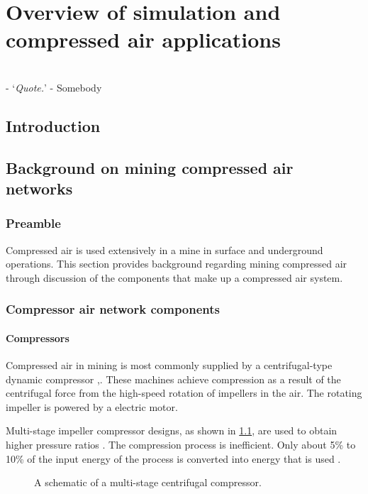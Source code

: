 \chapter{Overview of simulation and compressed air applications}
\label{Chap2}
\thispagestyle{empty}
\vspace{38em}
\hrulefill
\\-
\enquote*{\textit{Quote.}} - Somebody\\
\clearpage
\section{Introduction}
\section{Background on mining compressed air networks}
\subsection{Preamble}
Compressed air is used extensively in a mine in surface and underground operations. This section provides background regarding mining compressed air through discussion of the components that make up a compressed air system. 
\subsection{Compressor air network components}
\subsubsection{Compressors}

Compressed air in mining is most commonly supplied by a centrifugal-type dynamic compressor \cite{Fouche2016Masters},\cite{Booysen2012Masters}.  These machines achieve compression as a result of the centrifugal force from the high-speed rotation of impellers in the air. The rotating impeller is  powered by a electric motor.
\par 
 Multi-stage impeller compressor designs, as shown in \cref{fig: Compressor diagram}\footnotemark[1], are used to obtain higher pressure ratios \cite{Fouche2016Masters}. The compression process is inefficient. Only about 5\% to 10\% of the input energy of the process is converted into energy that is used \cite{yang2009air}. 
\begin{figure}[h]
	\centering
	\fbox{\hspace{3cm}\hspace{2.5cm}}
	\caption[A scematic of a multistage centrifugal compressor.]{A schematic of a multi-stage centrifugal compressor\protect \footnotemark[1].}
	\label{fig: Compressor diagram}
\end{figure}

